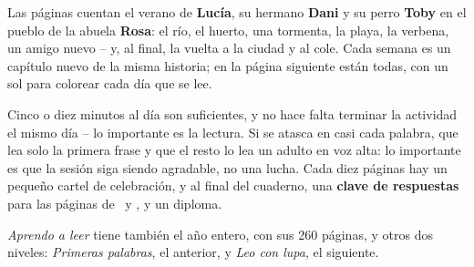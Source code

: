 Las páginas cuentan el verano de \textbf{Lucía}, su hermano
\textbf{Dani} y su perro \textbf{Toby} en el pueblo de la abuela
\textbf{Rosa}: el río, el huerto, una tormenta, la playa, la verbena, un
amigo nuevo -- y, al final, la vuelta a la ciudad y al cole. Cada semana
es un capítulo nuevo de la misma historia; en la página siguiente están
todas, con un sol para colorear cada día que se lee.

Cinco o diez minutos al día son suficientes, y no hace falta terminar
la actividad el mismo día -- lo importante es la lectura. Si se atasca
en casi cada palabra, que lea solo la primera frase y que el resto lo
lea un adulto en voz alta: lo importante es que la sesión siga siendo
agradable, no una lucha. Cada diez páginas hay un pequeño cartel de
celebración, y al final del cuaderno, una \textbf{clave de respuestas}
para las páginas de \lblAdivina\ y \lblRelaciona, y un diploma.

{\small\color{colorGris} \emph{Aprendo a leer} tiene también el año
entero, con sus 260 páginas, y otros dos niveles: \emph{Primeras
palabras}, el anterior, y \emph{Leo con lupa}, el siguiente.\par}
\newpage
